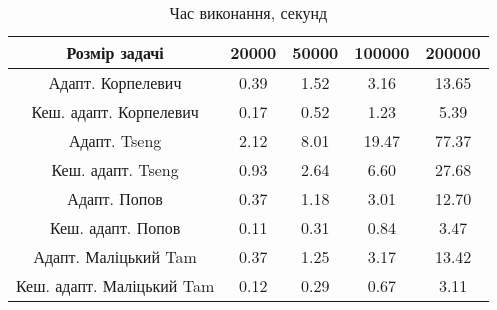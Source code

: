 \begin{table}[H]
	\centering
	\begin{tabular}{|c||c|c|c|c|}\hline
		Розмір задачі & 20000 & 50000 & 100000 & 200000 \\ \hline \hline
		Адапт. Корпелевич & 0.39 & 1.52 & 3.16 & 13.65 \\ \hline
		Кеш. адапт. Корпелевич & 0.17 & 0.52 & 1.23 & 5.39 \\ \hline
		Адапт. Tseng & 2.12 & 8.01 & 19.47 & 77.37 \\ \hline
		Кеш. адапт. Tseng & 0.93 & 2.64 & 6.60 & 27.68 \\ \hline
		Адапт. Попов & 0.37 & 1.18 & 3.01 & 12.70 \\ \hline
		Кеш. адапт. Попов & 0.11 & 0.31 & 0.84 & 3.47 \\ \hline
		Адапт. Маліцький Tam & 0.37 & 1.25 & 3.17 & 13.42 \\ \hline
		Кеш. адапт. Маліцький Tam & 0.12 & 0.29 & 0.67 & 3.11 \\ \hline
	\end{tabular}
	\caption{Час виконання, секунд}
\end{table}
